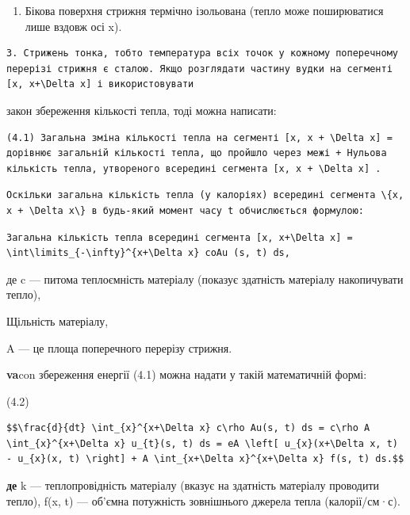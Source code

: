 \documentclass[
  ukrainian,
]{article}
\providecommand{\tightlist}{%
  \setlength{\itemsep}{0pt}\setlength{\parskip}{0pt}}
\begin{document}
\begin{enumerate}
\def\labelenumi{\arabic{enumi}.}
\setcounter{enumi}{1}
\tightlist
\item
  Бікова поверхня стрижня термічно ізольована (тепло може поширюватися
  лише вздовж осі x).
\end{enumerate}

\begin{verbatim}
3. Стрижень тонка, тобто температура всіх точок у кожному поперечному перерізі стрижня є сталою. Якщо розглядати частину вудки на сегменті [x, x+\Delta x] і використовувати
\end{verbatim}

закон збереження кількості тепла, тоді можна написати:

\begin{verbatim}
(4.1) Загальна зміна кількості тепла на сегменті [x, x + \Delta x] = дорівнює загальній кількості тепла, що пройшло через межі + Нульова кількість тепла, утвореного всередині сегмента [x, x + \Delta x] .
\end{verbatim}

\begin{verbatim}
Оскільки загальна кількість тепла (у калоріях) всередині сегмента \{x, x + \Delta x\} в будь-який момент часу t обчислюється формулою:
\end{verbatim}

\begin{verbatim}
Загальна кількість тепла всередині сегмента [x, x+\Delta x] = \int\limits_{-\infty}^{x+\Delta x} coAu (s, t) ds,
\end{verbatim}

де c --- питома теплоємність матеріалу (показує здатність матеріалу
накопичувати тепло),

Щільність матеріалу,

A --- це площа поперечного перерізу стрижня.

\textbf{va}con збереження енергії (4.1) можна надати у такій
математичній формі:

(4.2)

\begin{verbatim}
$$\frac{d}{dt} \int_{x}^{x+\Delta x} c\rho Au(s, t) ds = c\rho A \int_{x}^{x+\Delta x} u_{t}(s, t) ds = eA \left[ u_{x}(x+\Delta x, t) - u_{x}(x, t) \right] + A \int_{x+\Delta x}^{x+\Delta x} f(s, t) ds.$$
\end{verbatim}

\textbf{де} k --- теплопровідність матеріалу (вказує на здатність
матеріалу проводити тепло), f(x, t) --- об'ємна потужність зовнішнього
джерела тепла (калорії/см·с).
\end{document}
